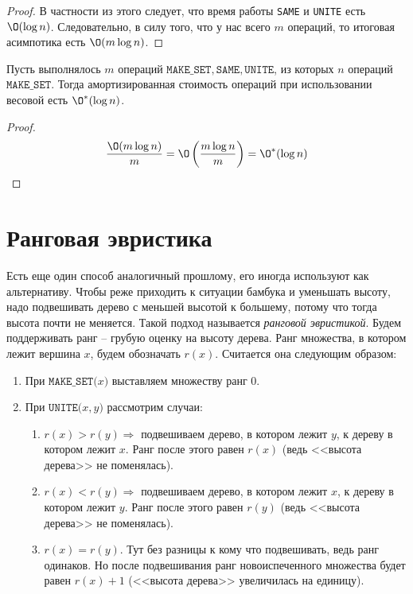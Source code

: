 \begin{proof}
    В частности из этого следует, что время работы \texttt{SAME} и \texttt{UNITE} есть $\O(\log n)$. Следовательно, в силу того, что у нас всего $m$ операций, то итоговая асимпотика есть $\O(m \log n)$.
\end{proof}

\Cons Пусть выполнялось $m$ операций $\texttt{MAKE\_SET}, \texttt{SAME}, \texttt{UNITE}$, из которых $n$ операций $\texttt{MAKE\_SET}$. Тогда амортизированная стоимость операций при использовании весовой есть $\O^*(\log n)$.
\begin{proof}

    \begin{equation*}
        \frac{\O(m \log n)}{m} = \O \left(\frac{m \log n}{m}\right) = \O^*(\log n)
    \end{equation*}
\end{proof}

\section{Ранговая эвристика\optstar}

Есть еще один способ аналогичный прошлому, его иногда используют как альтернативу. Чтобы реже приходить к ситуации бамбука и уменьшать высоту, надо подвешивать дерево с меньшей высотой к большему, потому что тогда высота почти не меняется.
Такой подход называется \textit{ранговой эвристикой}. Будем поддерживать ранг -- грубую оценку на высоту дерева. Ранг множества, в котором лежит вершина $x$, будем обозначать $r(x)$. Считается она следующим образом:
\begin{enumerate}
    \item При $\texttt{MAKE\_SET(}x\texttt{)}$ выставляем множеству ранг 0.
    \item При $\texttt{UNITE(}x, y\texttt{)}$ рассмотрим случаи:
        \begin{enumerate}
            \item $r(x) > r(y) \Rightarrow$ подвешиваем дерево, в котором лежит $y$, к дереву в котором лежит $x$. Ранг после этого равен $r(x)$ (ведь <<высота дерева>> не поменялась).
            \item $r(x) < r(y) \Rightarrow$ подвешиваем дерево, в котором лежит $x$, к дереву в котором лежит $y$. Ранг после этого равен $r(y)$ (ведь <<высота дерева>> не поменялась).
            \item $r(x) = r(y)$. Тут без разницы к кому что подвешивать, ведь ранг одинаков. Но после подвешивания ранг новоиспеченного множества будет равен $r(x) + 1$ (<<высота дерева>> увеличилась на единицу).
        \end{enumerate}
\end{enumerate}

